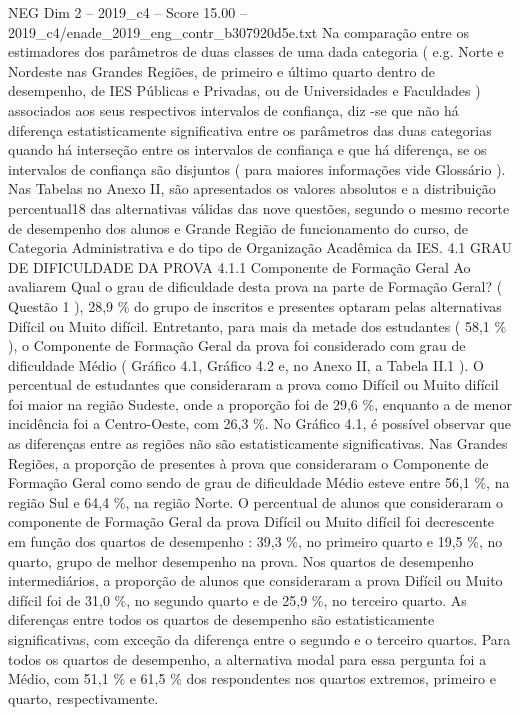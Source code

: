 \begin{textsample}{NEG Dim 2 – 2019\_c4 – Score 15.00 – 2019\_c4/enade\_2019\_eng\_contr\_b307920d5e.txt}
Na comparação entre os estimadores dos parâmetros de duas classes de uma dada categoria ( e.g.
Norte e Nordeste nas Grandes Regiões, de primeiro e último quarto dentro de desempenho, de IES Públicas e Privadas, ou de Universidades e Faculdades ) associados aos seus respectivos intervalos de confiança, diz -se que não há diferença estatisticamente significativa entre os parâmetros das duas categorias quando há interseção entre os intervalos de confiança e que há diferença, se os intervalos de confiança são disjuntos ( para maiores informações vide Glossário ).
Nas Tabelas no Anexo II, são apresentados os valores absolutos e a distribuição percentual18 das alternativas válidas das nove questões, segundo o mesmo recorte de desempenho dos alunos e Grande Região de funcionamento do curso, de Categoria Administrativa e do tipo de Organização Acadêmica da IES. 4.1 GRAU DE DIFICULDADE DA PROVA 4.1.1 Componente de Formação Geral Ao avaliarem Qual o grau de dificuldade desta prova na parte de Formação Geral? ( Questão 1 ), 28,9 \% do grupo de inscritos e presentes optaram pelas alternativas Difícil ou Muito difícil.
Entretanto, para mais da metade dos estudantes ( 58,1 \% ), o Componente de Formação Geral da prova foi considerado com grau de dificuldade Médio ( Gráfico 4.1, Gráfico 4.2 e, no Anexo II, a Tabela II.1 ).
O percentual de estudantes que consideraram a prova como Difícil ou Muito difícil foi maior na região Sudeste, onde a proporção foi de 29,6 \%, enquanto a de menor incidência foi a Centro-Oeste, com 26,3 \%.
No Gráfico 4.1, é possível observar que as diferenças entre as regiões não são estatisticamente significativas.
Nas Grandes Regiões, a proporção de presentes à prova que consideraram o Componente de Formação Geral como sendo de grau de dificuldade Médio esteve entre 56,1 \%, na região Sul e 64,4 \%, na região Norte.
O percentual de alunos que consideraram o componente de Formação Geral da prova Difícil ou Muito difícil foi decrescente em função dos quartos de desempenho : 39,3 \%, no primeiro quarto e 19,5 \%, no quarto, grupo de melhor desempenho na prova.
Nos quartos de desempenho intermediários, a proporção de alunos que consideraram a prova Difícil ou Muito difícil foi de 31,0 \%, no segundo quarto e de 25,9 \%, no terceiro quarto.
As diferenças entre todos os quartos de desempenho são estatisticamente significativas, com exceção da diferença entre o segundo e o terceiro quartos.
Para todos os quartos de desempenho, a alternativa modal para essa pergunta foi a Médio, com 51,1 \% e 61,5 \% dos respondentes nos quartos extremos, primeiro e quarto, respectivamente.

\end{textsample}
